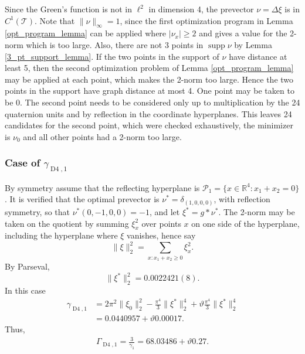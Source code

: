 \documentclass[a4paper, 12pt, notitlepage]{amsart}
\newcommand{\Dfour}{\operatorname{D4}}
\newcommand{\supp}{\operatorname{supp}}
\newcommand{\bR}{\mathbb{R}}
\newcommand{\sT}{\mathscr{T}}
\newcommand{\sP}{{\mathscr{P}}}
\theoremstyle{remark}
\begin{document}
Since the Green's function is not in $\ell^2$ in dimension 4, the prevector $\nu = \Delta \xi$ is in $C^1(\sT)$.    Note that $\|\nu\|_\infty = 1$, since the first optimization program in Lemma \ref{opt_program_lemma} can be applied where $|\nu_x| \geq 2$ and gives a value for the 2-norm which is too large.  Also, there are not 3 points in $\supp \nu$ by Lemma \ref{3_pt_support_lemma}. If the two points in the support of $\nu$ have distance at least 5, then the second optimization problem of Lemma \ref{opt_program_lemma} may be applied at each point, which makes the 2-norm too large.  Hence the two points in the support have graph distance at most 4.  One point may be taken to be 0.  The second point needs to be considered only up to multiplication by the 24 quaternion units and by reflection in the coordinate hyperplanes.  This leaves 24 candidates for the second point, which were checked exhaustively, the minimizer is $\nu_0$ and all other points had a 2-norm too large.



\subsubsection*{Case of $\gamma_{\Dfour,1}$}  By symmetry assume that the reflecting hyperplane is $\sP_1 =\{x \in \bR^4: x_1 + x_2 = 0\}$.  It is verified that the optimal prevector is $\nu^* = \delta_{(1, 0, 0, 0)}$, with reflection symmetry, so that $\nu^*(0, -1, 0,0) = -1$, and let $\xi^* = g*\nu^*$.  The 2-norm may be taken on the quotient by summing $\xi_x^2$ over points $x$ on one side of the hyperplane, including the hyperplane where $\xi$ vanishes, hence say
\begin{equation}
 \|\xi\|_2^2 = \sum_{x: x_1 + x_2 \geq 0} \xi_x^2.
\end{equation}
By Parseval,
\begin{equation}
 \|\xi^*\|_2^2 = 0.0022421(8).
\end{equation}
In this case
\begin{align*}
\gamma_{\Dfour,1}&= 2\pi^2 \|\xi_0\|_2^2 - \frac{\pi^4}{3}\|\xi^*\|_2^4 + \vartheta \frac{\pi^4}{3}\|\xi^*\|_2^4\\
 &=0.0440957 +\vartheta 0.00017.
\end{align*}
Thus,
\begin{align*}
 \Gamma_{\Dfour,1} = \frac{3}{\gamma_1} = 68.03486+ \vartheta 0.27.
\end{align*}
\end{document}
